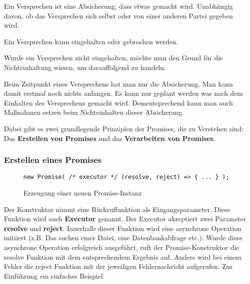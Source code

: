 \begin{description}
    \item Ein Versprechen ist eine Absicherung, dass etwas gemacht wird. Unabhängig davon, ob das Versprechen sich selbst oder von einer anderen Partei gegeben wird.
    
    \item Ein Versprechen kann eingehalten oder gebrochen werden.
    
    \item Wurde ein Versprechen nicht eingehalten, möchte man den Grund für die Nichteinhaltung wissen, um darauffolgend zu handeln.
    
    \item Beim Zeitpunkt eines Versprechens hat man nur die Absicherung. Man kann damit erstmal noch nichts anfangen. Es kann nur geplant werden was nach dem Einhalten des Versprechens gemacht wird. Dementsprechend kann man auch Maßnahmen setzen beim Nichteinhalten dieser Absicherung.
    
\end{description}

\noindent
Dabei gibt es zwei grundlegende Prinzipien der Promises, die zu Verstehen sind: Das \textbf{Erstellen von Promises} und das \textbf{Verarbeiten von Promises}.

\subsubsection{Erstellen eines Promises}

\begin{figure}[H]
\begin{lstlisting}[basicstyle=\small]
new Promise( /* executor */ (resolve, reject) => { ... } );
\end{lstlisting}
\caption{Erzeugung einer neuen Promise-Instanz}
\end{figure}

Der Konstruktor nimmt eine Rückruffunktion als Eingangsparameter. Diese Funktion wird auch \textbf{Executor} genannt.\cite{promise-executor} Der Executor akzeptiert zwei Parameter \textbf{resolve} und \textbf{reject}. Innerhalb dieser Funktion wird eine asynchrone Operation initiiert (z.B. Das suchen einer Datei, eine Datenbankabfrage etc.). Wurde diese asynchrone Operation erfolgreich ausgeführt, ruft der Promise-Konstruktor die resolve Funktion mit dem entsprechendem Ergebnis auf. Anders wird bei einem Fehler die reject Funktion mit der jeweiligen Fehlernachricht aufgerufen. Zur Einführung ein einfaches Beispiel:\\

